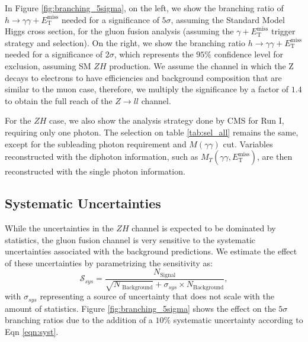 \documentclass[11pt]{article}
\newcommand{\MET}{\ensuremath{E_{\mathrm{T}}^{\mathrm{miss}}}\xspace}
\begin{document}
In Figure \ref{fig:branching_5sigma}, on the left, we show the branching ratio of $h\rightarrow\gamma\gamma+\MET$ needed for a significance of $5\sigma$, assuming the Standard Model Higgs cross section, for the gluon fusion analysis (assuming the $\gamma+\MET$ trigger strategy and selection). On the right, we show the branching ratio $h\rightarrow\gamma\gamma+\MET$ needed for a significance of $2\sigma$, which represents the $95\%$ confidence level for exclusion, assuming SM $ZH$ production. We assume the channel in which the Z decays to electrons to have efficiencies and background composition that are similar to the muon case, therefore, we multiply the significance by a factor of $1.4$ to obtain the full reach of the $Z\rightarrow ll$ channel.

For the $ZH$ case, we also show the analysis strategy done by CMS for Run I, requiring only one photon. The selection on table \ref{tab:sel_all} remains the same, except for the subleading photon requirement and $M(\gamma\gamma)$ cut. Variables reconstructed with the diphoton information, such as $M_{T}(\gamma\gamma,\MET)$, are then reconstructed with the single photon information.

\subsection{Systematic Uncertainties}

While the uncertainties in the $ZH$ channel is expected to be dominated by statistics, the gluon fusion channel is very sensitive to the systematic uncertainties associated with the background predictions. We estimate the effect of these uncertainties by parametrizing the sensitivity as:
%
\begin{equation}
\mathcal{S}_{sys} = \frac{N_\text{Signal}}{\sqrt{N_\text{ Background}}+\sigma_{sys}\times N_\text{Background}},
\label{eqn:syst}
\end{equation}
%
with $\sigma_{sys}$ representing a source of uncertainty that does not scale with the amount of statistics.
%
Figure \ref{fig:branching_5sigma} shows the effect on the $5\sigma$ branching ratios due to the addition of a $10\%$ systematic uncertainty according to Eqn \ref{eqn:syst}.
\end{document}
